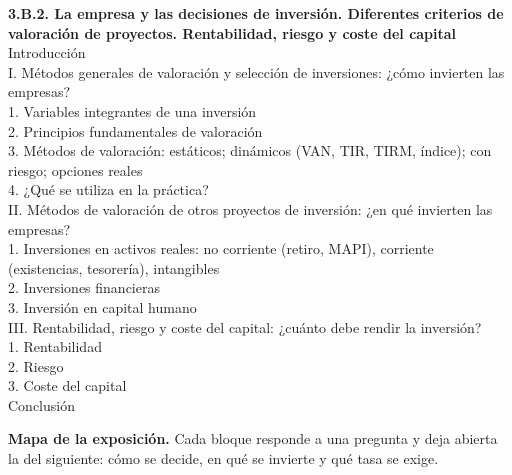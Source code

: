 \documentclass[11pt]{article}
\begin{document}
\begin{esquema}
\textbf{3.B.2. La empresa y las decisiones de inversión. Diferentes criterios de valoración de proyectos. Rentabilidad, riesgo y coste del capital}\\[2pt]
Introducción\\
I. Métodos generales de valoración y selección de inversiones: ¿cómo invierten las empresas?\\
\hspace*{1.5em}1. Variables integrantes de una inversión\\
\hspace*{1.5em}2. Principios fundamentales de valoración\\
\hspace*{1.5em}3. Métodos de valoración: estáticos; dinámicos (VAN, TIR, TIRM, índice); con riesgo; opciones reales\\
\hspace*{1.5em}4. ¿Qué se utiliza en la práctica?\\
II. Métodos de valoración de otros proyectos de inversión: ¿en qué invierten las empresas?\\
\hspace*{1.5em}1. Inversiones en activos reales: no corriente (retiro, MAPI), corriente (existencias, tesorería), intangibles\\
\hspace*{1.5em}2. Inversiones financieras\\
\hspace*{1.5em}3. Inversión en capital humano\\
III. Rentabilidad, riesgo y coste del capital: ¿cuánto debe rendir la inversión?\\
\hspace*{1.5em}1. Rentabilidad\\
\hspace*{1.5em}2. Riesgo\\
\hspace*{1.5em}3. Coste del capital\\
Conclusión
\end{esquema}

\begin{anotaciones}
\textbf{Mapa de la exposición.} Cada bloque responde a una pregunta y deja abierta la del siguiente: cómo se decide, en qué se invierte y qué tasa se exige.
\begin{infografiacaja}
\caption{Mapa del tema: la pregunta de cada bloque, sus subapartados y el hilo que los une}\label{figu:mapa-tema}
\end{infografiacaja}
\end{anotaciones}
\end{document}
